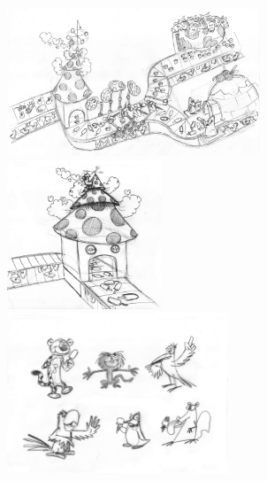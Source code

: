 \documentclass{sigchi}
\begin{document}
    \begin{figure}
        \centering
        \includegraphics[height=12em]{01}
        \includegraphics[height=12em]{02}
        \includegraphics[height=13em]{06}


\end{figure}
\end{document}
